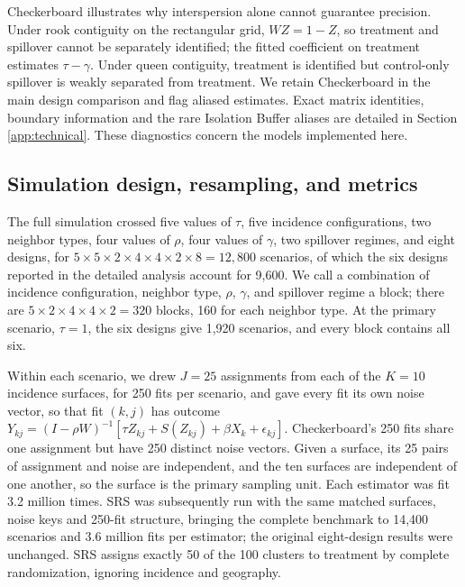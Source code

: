 \documentclass[11pt]{article}
\begin{document}
Checkerboard illustrates why interspersion alone cannot guarantee
precision. Under rook contiguity on the rectangular grid, \(WZ=1-Z\), so
treatment and spillover cannot be separately identified; the fitted
coefficient on treatment estimates \(\tau-\gamma\). Under queen
contiguity, treatment is identified but control-only spillover is weakly
separated from treatment. We retain Checkerboard in the main design
comparison and flag aliased estimates. Exact matrix identities, boundary
information and the rare Isolation Buffer aliases are detailed in
Section \ref{app:technical}. These diagnostics concern the models
implemented here.

\subsection{Simulation design, resampling, and
metrics}\label{simulation-design-resampling-and-metrics}

The full simulation crossed five values of \(\tau\), five incidence
configurations, two neighbor types, four values of \(\rho\), four values
of \(\gamma\), two spillover regimes, and eight designs, for
\(5 \times 5 \times 2 \times 4 \times 4 \times 2 \times 8 = 12{,}800\)
scenarios, of which the six designs reported in the detailed analysis
account for 9,600. We call a combination of incidence configuration,
neighbor type, \(\rho\), \(\gamma\), and spillover regime a block; there
are \(5 \times 2 \times 4 \times 4 \times 2 = 320\) blocks, 160 for each
neighbor type. At the primary scenario, \(\tau = 1\), the six designs
give 1,920 scenarios, and every block contains all six.

Within each scenario, we drew \(J = 25\) assignments from each of the
\(K = 10\) incidence surfaces, for 250 fits per scenario, and gave every
fit its own noise vector, so that fit \((k, j)\) has outcome
\(Y_{kj} = (I - \rho W)^{-1}[\tau Z_{kj} + S(Z_{kj}) + \beta X_k + \epsilon_{kj}]\).
Checkerboard's 250 fits share one assignment but have 250 distinct noise
vectors. Given a surface, its 25 pairs of assignment and noise are
independent, and the ten surfaces are independent of one another, so the
surface is the primary sampling unit. Each estimator was fit 3.2 million
times. SRS was subsequently run with the same matched surfaces, noise
keys and 250-fit structure, bringing the complete benchmark to 14,400
scenarios and 3.6 million fits per estimator; the original eight-design
results were unchanged. SRS assigns exactly 50 of the 100 clusters to
treatment by complete randomization, ignoring incidence and geography.
\end{document}
